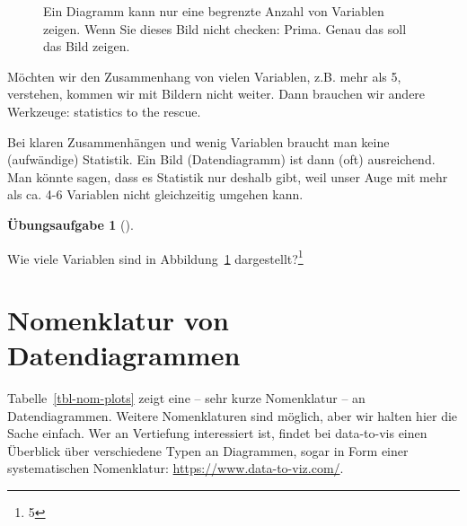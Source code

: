 \documentclass[
  letterpaper,
]{scrbook}
\theoremstyle{definition}
\newtheorem{exercise}{Übungsaufgabe}[chapter]
\theoremstyle{definition}
\theoremstyle{definition}
\theoremstyle{remark}
\begin{document}
\begin{figure}


\caption{\label{fig-many-dims}Ein Diagramm kann nur eine begrenzte
Anzahl von Variablen zeigen. Wenn Sie dieses Bild nicht checken: Prima.
Genau das soll das Bild zeigen.}

\end{figure}%

Möchten wir den Zusammenhang von vielen Variablen, z.B. mehr als 5,
verstehen, kommen wir mit Bildern nicht weiter. Dann brauchen wir andere
Werkzeuge: statistics to the rescue.

Bei klaren Zusammenhängen und wenig Variablen braucht man keine
(aufwändige) Statistik. Ein Bild (Datendiagramm) ist dann (oft)
ausreichend. Man könnte sagen, dass es Statistik nur deshalb gibt, weil
unser Auge mit mehr als ca. 4-6 Variablen nicht gleichzeitig umgehen
kann.

\begin{exercise}[]\protect\hypertarget{exr-anz-dims}{}\label{exr-anz-dims}

Wie viele Variablen sind in Abbildung~\ref{fig-many-dims}
dargestellt?\footnote{5}

\end{exercise}

\section{Nomenklatur von
Datendiagrammen}\label{nomenklatur-von-datendiagrammen}

Tabelle~\ref{tbl-nom-plots} zeigt eine -- sehr kurze Nomenklatur -- an
Datendiagrammen. Weitere Nomenklaturen sind möglich, aber wir halten
hier die Sache einfach. Wer an Vertiefung interessiert ist, findet bei
data-to-vis einen Überblick über verschiedene Typen an Diagrammen, sogar
in Form einer systematischen Nomenklatur:
\url{https://www.data-to-viz.com/}.
\end{document}
